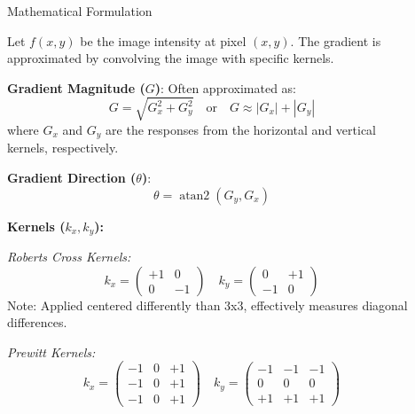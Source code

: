 \documentclass[final]{beamer}
\newlength{\sepwidth}
\newlength{\colwidth}
\newcommand{\separatorcolumn}{\begin{column}{\sepwidth}\end{column}}
\begin{document}
\begin{frame}[t]
\begin{columns}[t]
\begin{column}{\colwidth}
\end{column} %

\separatorcolumn %

\begin{column}{\colwidth}

  \begin{block}{Mathematical Formulation} \setlength{\parskip}{1pt} \linespread{1.0}

    Let $f(x, y)$ be the image intensity at pixel $(x, y)$. The gradient is approximated by convolving the image with specific kernels.

    \textbf{Gradient Magnitude ($G$)}: Often approximated as:
    \begin{equation*}
        G = \sqrt{G_x^2 + G_y^2} \quad \text{or} \quad G \approx |G_x| + |G_y|
    \end{equation*}
    where $G_x$ and $G_y$ are the responses from the horizontal and vertical kernels, respectively.

    \textbf{Gradient Direction ($\theta$)}:
    \begin{equation*}
        \theta = \operatorname{atan2}(G_y, G_x)
    \end{equation*}

    \textbf{Kernels ($k_x, k_y$):}

    \textit{Roberts Cross Kernels:}
    \begin{equation*}
    k_x = \begin{pmatrix} +1 & 0 \\ 0 & -1 \end{pmatrix} \quad
    k_y = \begin{pmatrix} 0 & +1 \\ -1 & 0 \end{pmatrix}
    \end{equation*}
    Note: Applied centered differently than 3x3, effectively measures diagonal differences.

    \textit{Prewitt Kernels:}
    \begin{equation*}
    k_x = \begin{pmatrix} -1 & 0 & +1 \\ -1 & 0 & +1 \\ -1 & 0 & +1 \end{pmatrix} \quad
    k_y = \begin{pmatrix} -1 & -1 & -1 \\ 0 & 0 & 0 \\ +1 & +1 & +1 \end{pmatrix}
    \end{equation*}


\end{block}
\end{column}
\end{columns}
\end{frame}
\end{document}
